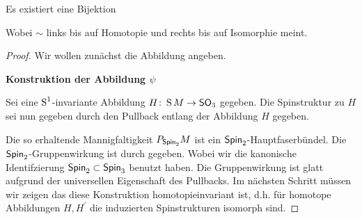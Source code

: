 \begin{Satz}\label{satz:spinstrukturen}
	Es existiert eine Bijektion
	\begin{center}
	\end{center}
	Wobei $ \sim $ links bis auf Homotopie und rechts bis auf Isomorphie meint.
	\begin{proof}

		Wir wollen zunächst die Abbildung angeben.
		
          \textbf{Konstruktion der Abbildung $\psi$}
		
          Sei eine $\S^1$-invariante Abbildung
          $\abb{H}{\S M}{\so_3}$ gegeben. Die Spinstruktur zu $ H $
          sei nun gegeben durch den Pullback entlang der Abbildung $ H $
          gegeben.
              \begin{center}
            \end{center}
          Die so erhaltende Mannigfaltigkeit $ \Ph{\spin_2}{M} $ ist ein
          $ \spin_2 $-Hauptfaserbündel. Die $ \spin_2 $-Gruppenwirkung
          ist durch
          gegeben. Wobei wir die kanonische Identifzierung $ \spin_2\subset\spin_3 $ benutzt haben. Die Gruppenwirkung ist
          glatt aufgrund der universellen Eigenschaft des Pullbacks.
	       Im nächsten Schritt müssen wir zeigen das diese Konstruktion
	        homotopieinvariant ist, d.h. für homotope Abbildungen $ H,H^{'} $ die induzierten Spinstrukturen isomorph sind.
	        

\end{proof}
\end{Satz}
